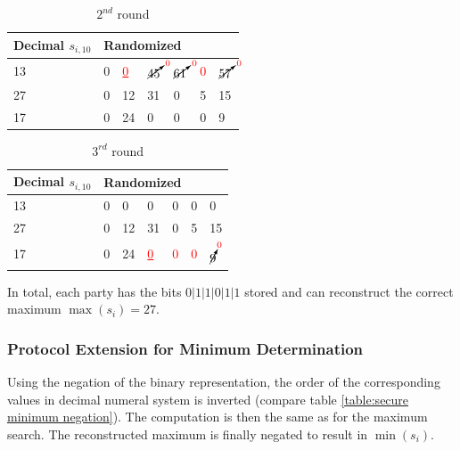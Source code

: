 		\begin{table}[!htb]
			\centering
			\caption{$2^{nd}$ round} \label{table:secure maximum p1 not maximum}
			\begin{tabular}{|l|l|l|l|l|l|l|}
				\hline
				Decimal $s_{i,10}$ & \multicolumn{6}{l|}{Randomized} \\ \hline
				13                 & 0    & \textcolor{red}{\underline{0}}    & $\cancelto{\textcolor{red}{0}}{45}$    & $\cancelto{\textcolor{red}{0}}{61}$    & \textcolor{red}{0}   & $\cancelto{\textcolor{red}{0}}{57}$   \\ \hline
				27                 & 0    & 12    & 31    & 0    & 5   & 15   \\ \hline
				17                 & 0    & 24    & 0    & 0    & 0   & 9   \\ \hline
			\end{tabular}
		\end{table}

		\begin{table}[!htb]
			\centering
			\caption{$3^{rd}$ round} \label{table:secure maximum p3 not maximum}
			\begin{tabular}{|l|l|l|l|l|l|l|}
				\hline
				Decimal $s_{i,10}$ & \multicolumn{6}{l|}{Randomized} \\ \hline
				13                 & 0    & 0    & 0    & 0    & 0   & 0   \\ \hline
				27                 & 0    & 12    & 31    & 0    & 5   & 15   \\ \hline
				17                 & 0    & 24    & \textcolor{red}{\underline{0}}    & \textcolor{red}{0}    & \textcolor{red}{0}   & $\cancelto{\textcolor{red}{0}}{9}$   \\ \hline
			\end{tabular}
		\end{table}

		In total, each party has the bits $0|1|1|0|1|1$ stored and can reconstruct the correct maximum $\max(s_i)=27$.
		
		\subsubsection{Protocol Extension for Minimum Determination} \label{Protocol Extension for Minimum Determination}
		
		Using the negation of the binary representation, the order of the corresponding values in decimal numeral system is inverted (compare table \ref{table:secure minimum negation}). The computation is then the same as for the maximum search. The reconstructed maximum is finally negated to result in $\min(s_i)$.
		
